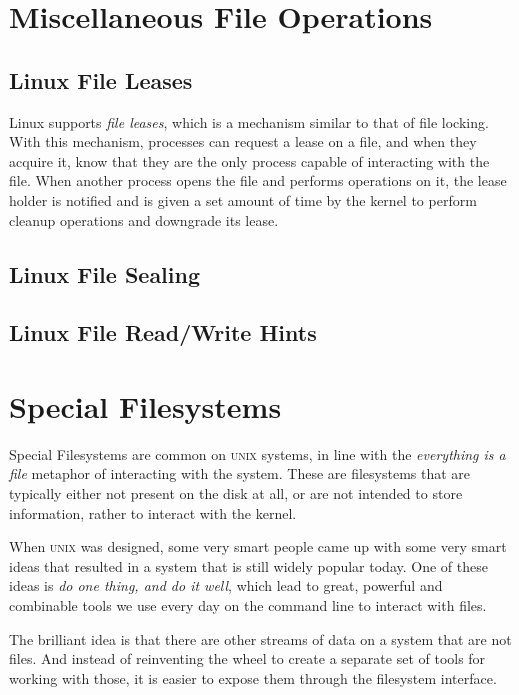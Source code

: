 \documentclass[a4paper]{article}
\begin{document}
\section{Miscellaneous File Operations}

\subsection{Linux File Leases}

Linux supports \emph{file leases}, which is a mechanism similar to that of file locking. With this mechanism, processes can request a lease on a file, and when they acquire it, know that they are the only process capable of interacting with the file. When another process opens the file and performs operations on it, the lease holder is notified and is given a set amount of time by the kernel to perform cleanup operations and downgrade its lease.

\subsection{Linux File Sealing}

\subsection{Linux File Read/Write Hints}


\section{Special Filesystems}


Special Filesystems are common on \textsc{unix} systems, in line with the \emph{everything is a file} metaphor of interacting with the system. These are filesystems that are typically either not present on the disk at all, or are not intended to store information, rather to interact with the kernel.

When \textsc{unix} was designed, some very smart people came up with some very smart ideas that resulted in a system that is still widely popular today. One of these ideas is \emph{do one thing, and do it well}, which lead to great, powerful and combinable tools we use every day on the command line to interact with files. 

The brilliant idea is that there are other streams of data on a system that are not files. And instead of reinventing the wheel to create a separate set of tools for working with those, it is easier to expose them through the filesystem interface.
\end{document}
